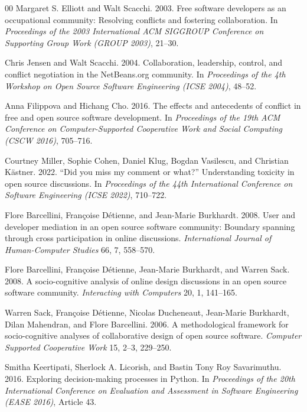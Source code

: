 \documentclass[sigconf,screen]{acmart}
\begin{document}
\begin{thebibliography}{00}
Margaret S. Elliott and Walt Scacchi. 2003. Free software developers as an occupational community: Resolving conflicts and fostering collaboration. In \emph{Proceedings of the 2003 International ACM SIGGROUP Conference on Supporting Group Work (GROUP 2003)}, 21--30.

Chris Jensen and Walt Scacchi. 2004. Collaboration, leadership, control, and conflict negotiation in the NetBeans.org community. In \emph{Proceedings of the 4th Workshop on Open Source Software Engineering (ICSE 2004)}, 48--52.

Anna Filippova and Hichang Cho. 2016. The effects and antecedents of conflict in free and open source software development. In \emph{Proceedings of the 19th ACM Conference on Computer-Supported Cooperative Work and Social Computing (CSCW 2016)}, 705--716.

Courtney Miller, Sophie Cohen, Daniel Klug, Bogdan Vasilescu, and Christian K\"astner. 2022. ``Did you miss my comment or what?'' Understanding toxicity in open source discussions. In \emph{Proceedings of the 44th International Conference on Software Engineering (ICSE 2022)}, 710--722.

Flore Barcellini, Fran\c{c}oise D\'etienne, and Jean-Marie Burkhardt. 2008. User and developer mediation in an open source software community: Boundary spanning through cross participation in online discussions. \emph{International Journal of Human-Computer Studies} 66, 7, 558--570.

Flore Barcellini, Fran\c{c}oise D\'etienne, Jean-Marie Burkhardt, and Warren Sack. 2008. A socio-cognitive analysis of online design discussions in an open source software community. \emph{Interacting with Computers} 20, 1, 141--165.

Warren Sack, Fran\c{c}oise D\'etienne, Nicolas Ducheneaut, Jean-Marie Burkhardt, Dilan Mahendran, and Flore Barcellini. 2006. A methodological framework for socio-cognitive analyses of collaborative design of open source software. \emph{Computer Supported Cooperative Work} 15, 2--3, 229--250.

Smitha Keertipati, Sherlock A. Licorish, and Bastin Tony Roy Savarimuthu. 2016. Exploring decision-making processes in Python. In \emph{Proceedings of the 20th International Conference on Evaluation and Assessment in Software Engineering (EASE 2016)}, Article 43.


\end{thebibliography}
\end{document}

